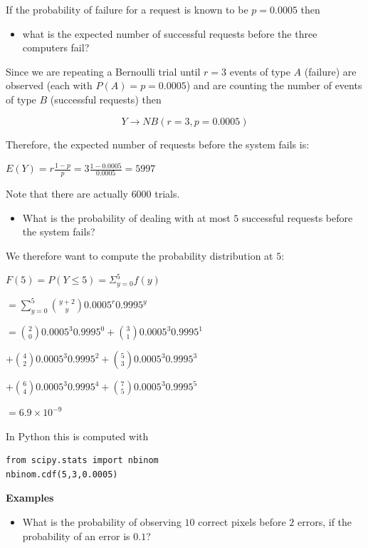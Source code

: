 \documentclass[
]{book}
\providecommand{\tightlist}{%
  \setlength{\itemsep}{0pt}\setlength{\parskip}{0pt}}
\begin{document}
If the probability of failure for a request is known to be \(p=0.0005\) then

\begin{itemize}
\tightlist
\item
  what is the expected number of successful requests before the three computers fail?
\end{itemize}

Since we are repeating a Bernoulli trial until \(r=3\) events of type \(A\) (failure) are observed (each with \(P(A)=p=0.0005\)) and are counting the number of events of type \(B\) (successful requests) then

\[Y \rightarrow NB(r=3, p=0.0005)\]

Therefore, the expected number of requests before the system fails is:

\(E(Y)=r\frac{1-p}{p}=3\frac{1-0.0005}{0.0005}=5997\)

Note that there are actually \(6000\) trials.

\begin{itemize}
\tightlist
\item
  What is the probability of dealing with at most \(5\) successful requests before the system fails?
\end{itemize}

We therefore want to compute the probability distribution at \(5\):

\(F(5)=P(Y\leq 5)=\Sigma_{y=0}^5 f(y)\)

\(=\sum_{y=0}^5\binom {y+2} y 0.0005^r0.9995^y\)

\(=\binom {2} 0 0.0005^3 0.9995^0 +\binom {3} 1 0.0005^3 0.9995^1\)

\(+\binom {4} 2 0.0005^3 0.9995^2 +\binom {5} 3 0.0005^3 0.9995^3\)

\(+\binom {6} 4 0.0005^3 0.9995^4 +\binom {7} 5 0.0005^3 0.9995^5\)

\(= 6.9\times 10^{-9}\)

In Python this is computed with

\begin{verbatim}
from scipy.stats import nbinom
nbinom.cdf(5,3,0.0005)
\end{verbatim}

\textbf{Examples}

\begin{itemize}
\tightlist
\item
  What is the probability of observing \(10\) correct pixels before \(2\) errors, if the probability of an error is \(0.1\)?
\end{itemize}
\end{document}

